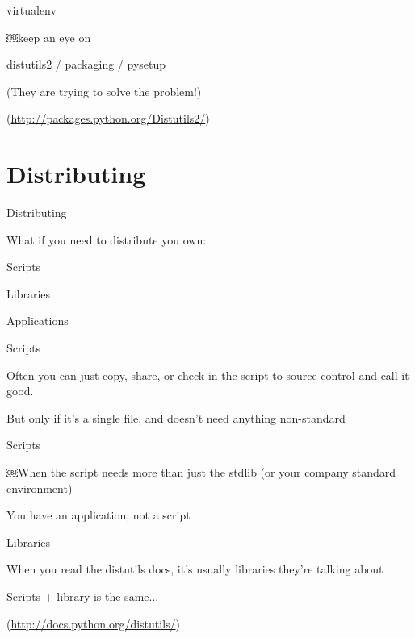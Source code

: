 \documentclass{beamer}
\begin{document}
\begin{frame}[fragile]{virtualenv}

{\Large ￼keep an eye on}

\vfill
{\Large distutils2 / packaging / pysetup }

\vfill
{\large (They are trying to solve the problem!) }

\vfill
(\url{http://packages.python.org/Distutils2/})
\end{frame} 

\section{Distributing}

\begin{frame}[fragile]{Distributing}

{\LARGE What if you need to distribute you own:}

\vfill
{\Large Scripts}

\vfill
{\large Libraries }

\vfill
{\large Applications }
\vfill

\end{frame} 

\begin{frame}[fragile]{Scripts}

\vfill
{\LARGE Often you can just copy, share, or check in the script to source
control and call it good.}

\vfill
But only if it's a single file, and doesn't need anything non-standard
\end{frame} 

\begin{frame}[fragile]{Scripts}

\vfill
{\LARGE ￼When the script needs more than just the stdlib (or your company standard environment)}

\vfill
{\LARGE You have an application, not a script}

\vfill

\end{frame} 

\begin{frame}[fragile]{Libraries}

\vfill
{\LARGE When you read the distutils docs, it's usually libraries they’re talking about}


\vfill
{\LARGE Scripts + library is the same...}


\vfill
(\url{http://docs.python.org/distutils/})
\end{frame} 
\end{document}
